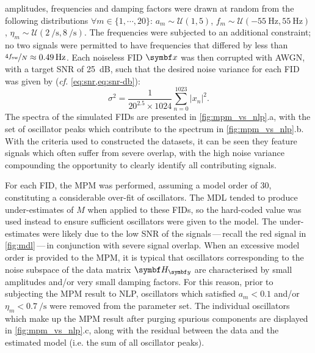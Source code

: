 amplitudes, frequencies and damping factors were drawn at random from the
following distributions
$\forall m \in \lbrace 1, \cdots, 20\rbrace$:
$a_m \sim \mathcal{U}(1, 5)$, $f_m \sim \mathcal{U}(\qty{-55}{\hertz},
\qty{55}{\hertz})$, $\eta_m \sim \mathcal{U}(\qty{2}{\per\second},
\qty{8}{\per\second})$. The frequencies were subjected to an additional
constraint; no two signals were permitted to have frequencies that
differed by less than $\nicefrac{4 f_{\mathrm{sw}}}{N} \approx \qty{0.49}{\hertz}$.
Each noiseless \ac{FID} $\bx$ was then corrupted with \ac{AWGN}, with a target
\ac{SNR} of \qty{25}{\deci\bel}, such that the desired noise variance for each
\ac{FID} was given by (\emph{cf.} \cref{eq:snr,eq:snr-db}):
\begin{equation}
    \sigma^2 = \frac{1}{20^{2.5} \times 1024}
        \sum_{n=0}^{1023} \lvert x_n \rvert^2.
\end{equation}
The spectra of the simulated \acp{FID} are presented in
\cref{fig:mpm_vs_nlp}.a, with the set of oscillator peaks which contribute
to the spectrum in \cref{fig:mpm_vs_nlp}.b. With the criteria used to
constructed the datasets, it can be seen they feature signals which often
suffer from severe overlap, with the high noise variance compounding the
opportunity to clearly identify all contributing signals.

For each \ac{FID}, the \ac{MPM} was performed, assuming a model order of
30, constituting a considerable over-fit of oscillators. The \ac{MDL} tended to
produce under-estimates of $M$ when applied to these \acp{FID}, so the
hard-coded value was used instead to ensure sufficient oscillators were given
to the model. The under-estimates were likely due to the
low \ac{SNR} of the signals\,---\,recall the red signal in \cref{fig:mdl}\,---\,in
conjunction with severe signal overlap. When an excessive model order is
provided to the \ac{MPM}, it is typical that oscillators corresponding to the
noise subspace of the data matrix $\Hy$ are characterised by small amplitudes
and/or very small damping factors. For this reason, prior to subjecting the
\ac{MPM} result to \ac{NLP}, oscillators which satisfied $a_m < 0.1$ and/or
$\eta_m < \qty{0.7}{\per\second}$ were removed from the parameter set. The
individual oscillators which make up the \ac{MPM} result after purging spurious
components are displayed in \cref{fig:mpm_vs_nlp}.c, along with the
residual between the data and the estimated model (i.e. the sum of all
oscillator peaks).

